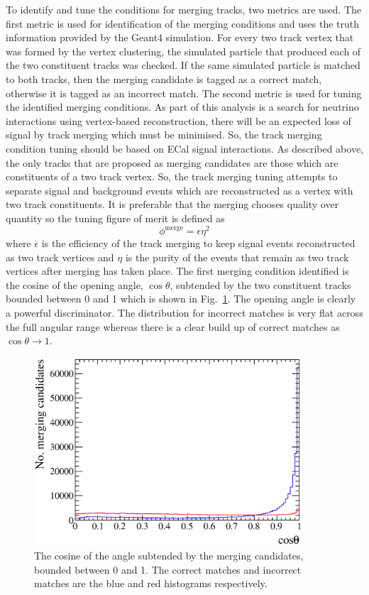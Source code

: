 To identify and tune the conditions for merging tracks, two metrics are used.  The first metric is used for identification of the merging conditions and uses the truth information provided by the Geant4 simulation.  For every two track vertex that was formed by the vertex clustering, the simulated particle that produced each of the two constituent tracks was checked.  If the same simulated particle is matched to both tracks, then the merging candidate is tagged as a correct match, otherwise it is tagged as an incorrect match.  The second metric is used for tuning the identified merging conditions.  As part of this analysis is a search for neutrino interactions using vertex-based reconstruction, there will be an expected loss of signal by track merging which must be minimised.  So, the track merging condition tuning should be based on ECal signal interactions.  As described above, the only tracks that are proposed as merging candidates are those which are constituents of a two track vertex.  So, the track merging tuning attempts to separate signal and background events which are reconstructed as a vertex with two track constituents.  It is preferable that the merging chooses quality over quantity so the tuning figure of merit is defined as 
\begin{equation}
  \phi^{\textrm{merge}} = \epsilon \eta^2
  \label{eqn:TrackMergingTuningMetric}
\end{equation}
where $\epsilon$ is the efficiency of the track merging to keep signal events reconstructed as two track vertices and $\eta$ is the purity of the events that remain as two track vertices after merging has taken place.
\newline
\newline
The first merging condition identified is the cosine of the opening angle, $\cos\theta$, subtended by the two constituent tracks bounded between 0 and 1 which is shown in Fig.~\ref{fig:TrackMergingConditionCosTheta}.  The opening angle is clearly a powerful discriminator.  The distribution for incorrect matches is very flat across the full angular range whereas there is a clear build up of correct matches as $\cos\theta \rightarrow 1$.
\begin{figure}[!t]
  \centering
  \includegraphics[width=10cm]{images/selection/vertex_recon/merging_candidates_cos_theta}
  \caption{The cosine of the angle subtended by the merging candidates, bounded between 0 and 1. The correct matches and incorrect matches are the blue and red histograms respectively.}
  \label{fig:TrackMergingConditionCosTheta}
\end{figure}
